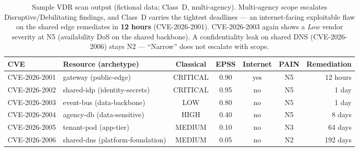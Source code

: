 \documentclass[11pt]{article}
\newcommand{\tagn}[1]{{\footnotesize\ttfamily #1}}
\begin{document}
\begin{table}[H]
\centering
\renewcommand{\arraystretch}{1.3}
\setlength{\tabcolsep}{4pt}
\footnotesize
\begin{tabular}{l l c c c c r}
\toprule
\textbf{CVE} & \textbf{Resource (archetype)} & \textbf{Classical} & \textbf{EPSS} & \textbf{Internet} & \textbf{PAIN} & \textbf{Remediation} \\
\midrule
CVE-2026-2001 & gateway \tagn{(public-edge)}         & \cellcolor{crit!25}CRITICAL & 0.90 & yes & \cellcolor{crit!30}N5 & 12 hours \\
CVE-2026-2002 & shared-idp \tagn{(identity-secrets)} & \cellcolor{crit!25}CRITICAL & 0.95 & no  & \cellcolor{crit!30}N5 & 1 day \\
CVE-2026-2003 & event-bus \tagn{(data-backbone)}     & \cellcolor{low!30}LOW       & 0.80 & no  & \cellcolor{crit!30}N5 & 1 day \\
CVE-2026-2004 & agency-db \tagn{(data-sensitive)}    & \cellcolor{high!25}HIGH     & 0.40 & no  & \cellcolor{crit!30}N5 & 8 days \\
CVE-2026-2005 & tenant-pod \tagn{(app-tier)}         & \cellcolor{med!35}MEDIUM    & 0.10 & no  & \cellcolor{med!35}N3 & 64 days \\
CVE-2026-2006 & shared-dns \tagn{(platform-foundation)} & \cellcolor{med!35}MEDIUM & 0.05 & no  & \cellcolor{low!30}N2 & 192 days \\
\bottomrule
\end{tabular}
\caption{Sample VDR scan output (fictional data; Class~D, multi-agency). Multi-agency
scope escalates Disruptive/Debilitating findings, and Class~D carries the tightest
deadlines --- an internet-facing exploitable flaw on the shared edge remediates in
\textbf{12 hours} (CVE-2026-2001). CVE-2026-2003 again shows a \emph{Low} vendor
severity at N5 (availability DoS on the shared backbone). A confidentiality leak on
shared DNS (CVE-2026-2006) stays N2 --- ``Narrow'' does not escalate with scope.}
\label{tab:scand}
\end{table}
\end{document}
